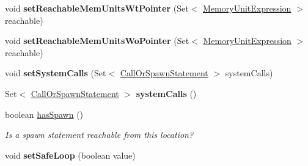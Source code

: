 \begin{DoxyCompactItemize}
\item 
\hypertarget{classedu_1_1udel_1_1cis_1_1vsl_1_1civl_1_1model_1_1common_1_1location_1_1CommonLocation_ab1b15b09942cedc2c3077559f31a742f}{}void {\bfseries set\+Reachable\+Mem\+Units\+Wt\+Pointer} (Set$<$ \hyperlink{interfaceedu_1_1udel_1_1cis_1_1vsl_1_1civl_1_1model_1_1IF_1_1expression_1_1MemoryUnitExpression}{Memory\+Unit\+Expression} $>$ reachable)\label{classedu_1_1udel_1_1cis_1_1vsl_1_1civl_1_1model_1_1common_1_1location_1_1CommonLocation_ab1b15b09942cedc2c3077559f31a742f}

\item 
\hypertarget{classedu_1_1udel_1_1cis_1_1vsl_1_1civl_1_1model_1_1common_1_1location_1_1CommonLocation_a50304b6ef023d0fa7176cb9c16e938e4}{}void {\bfseries set\+Reachable\+Mem\+Units\+Wo\+Pointer} (Set$<$ \hyperlink{interfaceedu_1_1udel_1_1cis_1_1vsl_1_1civl_1_1model_1_1IF_1_1expression_1_1MemoryUnitExpression}{Memory\+Unit\+Expression} $>$ reachable)\label{classedu_1_1udel_1_1cis_1_1vsl_1_1civl_1_1model_1_1common_1_1location_1_1CommonLocation_a50304b6ef023d0fa7176cb9c16e938e4}

\item 
\hypertarget{classedu_1_1udel_1_1cis_1_1vsl_1_1civl_1_1model_1_1common_1_1location_1_1CommonLocation_ad3003aae38812415cc56c7d16459f8ff}{}void {\bfseries set\+System\+Calls} (Set$<$ \hyperlink{interfaceedu_1_1udel_1_1cis_1_1vsl_1_1civl_1_1model_1_1IF_1_1statement_1_1CallOrSpawnStatement}{Call\+Or\+Spawn\+Statement} $>$ system\+Calls)\label{classedu_1_1udel_1_1cis_1_1vsl_1_1civl_1_1model_1_1common_1_1location_1_1CommonLocation_ad3003aae38812415cc56c7d16459f8ff}

\item 
\hypertarget{classedu_1_1udel_1_1cis_1_1vsl_1_1civl_1_1model_1_1common_1_1location_1_1CommonLocation_a596a661546f35fe5005ec1522a939aed}{}Set$<$ \hyperlink{interfaceedu_1_1udel_1_1cis_1_1vsl_1_1civl_1_1model_1_1IF_1_1statement_1_1CallOrSpawnStatement}{Call\+Or\+Spawn\+Statement} $>$ {\bfseries system\+Calls} ()\label{classedu_1_1udel_1_1cis_1_1vsl_1_1civl_1_1model_1_1common_1_1location_1_1CommonLocation_a596a661546f35fe5005ec1522a939aed}

\item 
boolean \hyperlink{classedu_1_1udel_1_1cis_1_1vsl_1_1civl_1_1model_1_1common_1_1location_1_1CommonLocation_a5fbc6a373c15140f222e2b96f8506ca4}{has\+Spawn} ()
\begin{DoxyCompactList}\small\item\em Is a spawn statement reachable from this location? \end{DoxyCompactList}\item 
\hypertarget{classedu_1_1udel_1_1cis_1_1vsl_1_1civl_1_1model_1_1common_1_1location_1_1CommonLocation_ae5b04183c6375938d8af07650f3a8542}{}void {\bfseries set\+Safe\+Loop} (boolean value)\label{classedu_1_1udel_1_1cis_1_1vsl_1_1civl_1_1model_1_1common_1_1location_1_1CommonLocation_ae5b04183c6375938d8af07650f3a8542}


\end{DoxyCompactItemize}
